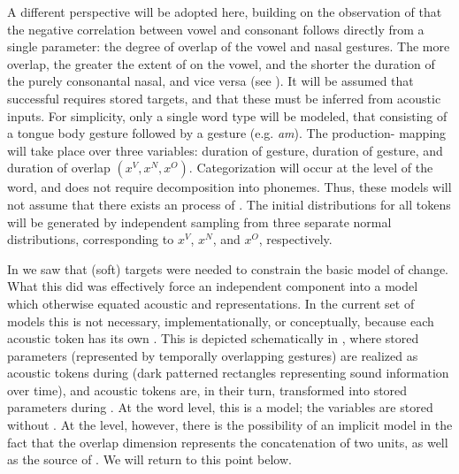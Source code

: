 A different perspective will be adopted here, building on the observation
of \citet{Beddor2009} that the negative correlation between vowel
 and consonant  follows directly from a single 
parameter: the degree of overlap of the vowel and nasal gestures.
The more overlap, the greater the extent of  on the vowel,
and the shorter the duration of the purely consonantal nasal, and
vice versa (see ). It will be assumed
that successful  requires stored  targets, and
that these must be inferred from acoustic inputs. For simplicity,
only a single word type will be modeled, that consisting of a tongue
body gesture followed by a  gesture (e.g. \textit{am}). The production-
mapping will take place over three  variables: duration of
 gesture, duration of  gesture, and duration of 
overlap $(x^{V},x^{N},x^{O})$. Categorization will occur at the level
of the word, and does not require decomposition into phonemes. Thus,
these models will not assume that there exists an  process
of . The initial distributions for all tokens will
be generated by independent sampling from three separate normal distributions,
corresponding to $x^{V}$, $x^{N}$, and $x^{O}$, respectively. 

In  we saw that (soft) targets
were needed to constrain the basic  model of change. What
this did was effectively force an independent  component
into a model which otherwise equated acoustic and  representations.
In the current set of models this is not necessary, implementationally,
or conceptually, because each acoustic token has its own 
. This is depicted schematically in ,
where stored  parameters (represented by temporally overlapping
 gestures) are realized as acoustic tokens during 
(dark patterned rectangles representing sound  information
over time), and acoustic tokens are, in their turn, transformed into
stored  parameters during . At the word level,
this is a  model; the  variables are stored
without . At the  level, however, there is the
possibility of an implicit  model in the fact that the
overlap dimension represents the concatenation of two units, as well
as the source of . We will return to this point below.

